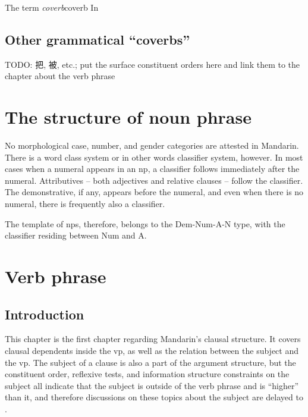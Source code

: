 \documentclass[UTF8, a4paper, oneside, scheme=plain, 12pt]{ctexrep}
\newcommand*{\term}[1]{\emph{#1}}
\begin{document}
\begin{infobox}{The term \term{coverb}}{coverb}
    In 
\end{infobox}

\section{Other grammatical ``coverbs''}

TODO: 把, 被, etc.; put the surface constituent orders here 
and link them to the chapter about the verb phrase

\chapter{The structure of noun phrase}

No morphological case, number, and gender categories are attested in Mandarin.
There is a word class system or in other words classifier system, however.
In most cases when a numeral appears in an \ac{np},
a classifier follows immediately after the numeral.
Attributives -- both adjectives and relative clauses -- 
follow the classifier. %
The demonstrative, if any, appears before the numeral,
and even when there is no numeral,
there is frequently also a classifier.

The template of \ac{np}s, therefore, belongs to the 
Dem-Num-A-N type,
with the classifier residing between Num and A. 


\chapter{Verb phrase}\label{chap:verbal-complex}

\section{Introduction}

This chapter is the first chapter regarding Mandarin's clausal structure.
It covers clausal dependents inside the \acs{vp},
as well as the relation between the subject and the \acs{vp}.
The subject of a clause is also a part of the argument structure,
but the constituent order,
reflexive tests,
and information structure constraints on the subject
all indicate that the subject is outside of the verb phrase 
and is ``higher'' than it,
and therefore discussions on these topics about the subject 
are delayed to .
\end{document}
